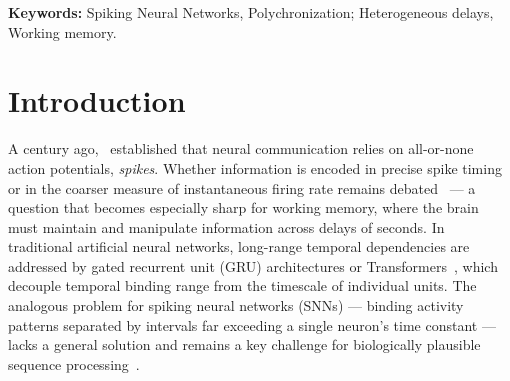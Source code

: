 \documentclass{scrartcl}
\title{\Title}
\author{
  \AuthorLP \\
  \texttt{\EmailLP} \\
  \Department \\
  \Affiliation \\
  \Street, \PostCode\ \City, \Country \\
  \url{\WebsiteLP/perrinet-26}
}
\date{\today}
\newcommand{\citep}[1]{\parencite{#1}}
\newcommand{\citet}[1]{\textcite{#1}}
\begin{document}
\maketitle

\begin{abstract}
\Abstract
\end{abstract}
\noindent\textbf{Keywords:} Spiking Neural Networks, Polychronization; Heterogeneous delays, Working memory.

\section{Introduction}

A century ago,~\citet{Adrian1926} established that neural communication relies on all-or-none action potentials, \emph{spikes}. Whether information is encoded in precise spike timing or in the coarser measure of instantaneous firing rate remains debated~\citep{Softky1993,Bohte2004,Grimaldi2023} --- a question that becomes especially sharp for working memory, where the brain must maintain and manipulate information across delays of seconds. In traditional artificial neural networks, long-range temporal dependencies are addressed by gated recurrent unit (GRU) architectures or Transformers~\citep{Vaswani2017}, which decouple temporal binding range from the timescale of individual units. The analogous problem for spiking neural networks (SNNs) --- binding activity patterns separated by intervals far exceeding a single neuron's time constant --- lacks a general solution and remains a key challenge for biologically plausible sequence processing~\citep{Yin2026}.
\end{document}
